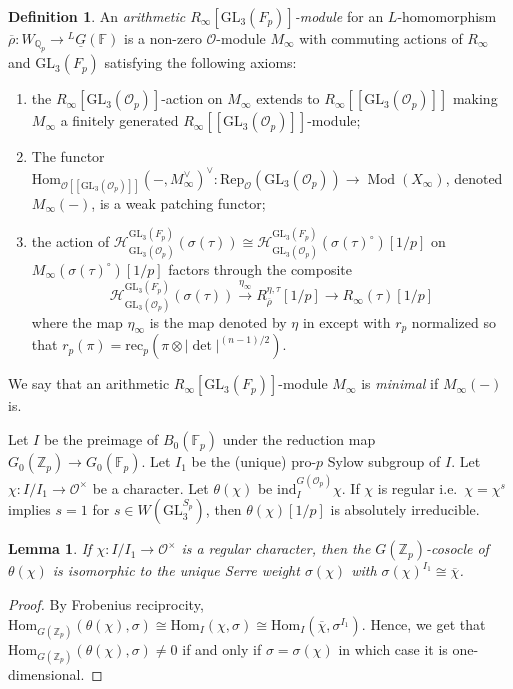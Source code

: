 \documentclass[oneside,a4paper,english, 11pt]{amsart}
\theoremstyle{plain}
\theoremstyle{plain}
\theoremstyle{plain}
\newtheorem{lemma}[thm]{Lemma}
\theoremstyle{plain}
\theoremstyle{plain}
\theoremstyle{plain}
\theoremstyle{definition}
\newtheorem{defn}[thm]{Definition}
\theoremstyle{definition}
\theoremstyle{definition}
\theoremstyle{remark}
\numberwithin{equation}{section}
\newcommand{\Z}{\mathbb{Z}}
\newcommand{\Qp}{\mathbb{Q}_p}
\newcommand{\F}{\mathbb{F}}
\newcommand{\cH}{\mathcal{H}}
\newcommand{\cO}{\mathcal{O}}
\newcommand{\Hom}{\mathrm{Hom}}
\newcommand{\ind}{\mathrm{ind}}
\newcommand{\GL}{\mathrm{GL}}
\newcommand{\isom}{\cong}
\newcommand{\un}[1]{\underline{#1}}
\newcommand{\Rep}{\mathrm{Rep}}
\newcommand{\rhobar}{\overline{\rho}}
\newcommand{\ovl}[1]{\overline{#1}}
\DeclareMathOperator{\Coh}{Mod}
\newcommand{\ra}{\rightarrow}
\begin{document}
\begin{defn}
\label{defn:patch}
An \emph{arithmetic $R_\infty[\GL_3(F_p)]$-module} for an $L$-homomorphism $\rhobar: W_{\Qp}\ra{}^L\un{G}(\F)$ is a non-zero $\cO$-module $M_\infty$ with commuting actions of $R_\infty$ and $\GL_3(F_p)$ satisfying the following axioms:
\begin{enumerate}
\item
\label{it:patch:1}
the $R_\infty[\GL_3(\cO_p)]$-action on $M_\infty$ extends to $R_\infty[\![\GL_3(\cO_p)]\!]$ making $M_\infty$ a finitely generated $R_\infty[\![\GL_3(\cO_p)]\!]$-module;
\item
\label{it:patch:2}
The functor $\Hom_{\cO[\![\GL_3(\cO_p)]\!]}(-,M_\infty^\vee)^\vee: \Rep_{\cO}(\GL_3(\cO_p))\ra \Coh(X_{\infty})$, denoted $M_\infty(-)$, is a weak patching functor;
\item
\label{it:patch:3}
the action of $\cH_{\GL_3(\cO_p)}^{\GL_3(F_p)}(\sigma(\tau)) \cong \cH_{\GL_3(\cO_p)}^{\GL_3(F_p)}(\sigma(\tau)^\circ)[1/p]$ on $M_\infty(\sigma(\tau)^\circ)[1/p]$ factors through the composite
\[
\cH_{\GL_3(\cO_p)}^{\GL_3(F_p)}(\sigma(\tau)) \stackrel{\eta_\infty}{\longrightarrow} R_{\rhobar}^{\eta,\tau}[1/p]\longrightarrow R_{\infty}(\tau)[1/p]
\]
where the map $\eta_\infty$ is the map denoted by $\eta$ in \cite[Theorem 4.1]{CEGGPS} except with $r_p$ normalized so that $r_p(\pi) = \mathrm{rec}_p(\pi\otimes |\det|^{(n-1)/2})$.
\end{enumerate}
We say that an arithmetic $R_\infty[\GL_3(F_p)]$-module $M_\infty$ is \emph{minimal} if $M_\infty(-)$ is. 
\end{defn}

Let $I$ be the preimage of $B_0(\F_p)$ under the reduction map $G_0(\Z_p) \ra G_0(\F_p)$.
Let $I_1$ be the (unique) pro-$p$ Sylow subgroup of $I$. 
%
Let $\chi: I/I_1 \ra \cO^\times$ be a character. 
Let $\theta(\chi)$ be $\ind_I^{G(\cO_p)} \chi$.
If $\chi$ is regular i.e.~$\chi = \chi^s$ implies $s = 1$ for $s \in W(\GL_3^{S_p})$, then $\theta(\chi)[1/p]$ is absolutely irreducible.

\begin{lemma}\label{lemma:cosoc}
If $\chi: I/I_1 \ra \cO^\times$ is a regular character, then the $G(\Z_p)$-cosocle of $\theta(\chi)$ is isomorphic to the unique Serre weight $\sigma(\chi)$ with $\sigma(\chi)^{I_1} \isom \ovl{\chi}$.
\end{lemma}
\begin{proof}
By Frobenius reciprocity, $\Hom_{G(\Z_p)}(\theta(\chi),\sigma) \cong \Hom_I(\chi,\sigma) \cong \Hom_I(\ovl{\chi},\sigma^{I_1})$. 
Hence, we get that $\Hom_{G(\Z_p)}(\theta(\chi),\sigma) \neq 0$ if and only if $\sigma = \sigma(\chi)$ in which case it is one-dimensional.
\end{proof}
\end{document}

